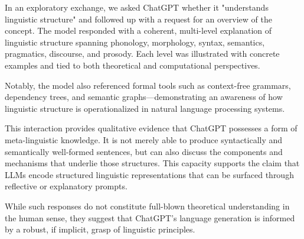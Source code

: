 In an exploratory exchange, we asked ChatGPT whether it "understands linguistic structure" and followed up with a request for an overview of the concept. The model responded with a coherent, multi-level explanation of linguistic structure spanning phonology, morphology, syntax, semantics, pragmatics, discourse, and prosody. Each level was illustrated with concrete examples and tied to both theoretical and computational perspectives.

Notably, the model also referenced formal tools such as context-free grammars, dependency trees, and semantic graphs—demonstrating an awareness of how linguistic structure is operationalized in natural language processing systems.

This interaction provides qualitative evidence that ChatGPT possesses a form of meta-linguistic knowledge. It is not merely able to produce syntactically and semantically well-formed sentences, but can also discuss the components and mechanisms that underlie those structures. This capacity supports the claim that LLMs encode structured linguistic representations that can be surfaced through reflective or explanatory prompts.

While such responses do not constitute full-blown theoretical understanding in the human sense, they suggest that ChatGPT's language generation is informed by a robust, if implicit, grasp of linguistic principles.
